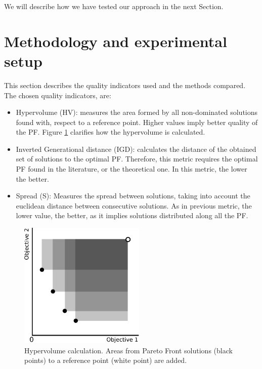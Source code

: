 \documentclass[Afour,sageh,times]{sagej}
\begin{document}
We will describe how we have tested our approach in the next Section.




%
%
\section{Methodology and experimental setup}
\label{sec:met}

This section describes the quality indicators used and the methods compared. The chosen quality indicators, are:

\begin{itemize}
\item Hypervolume (HV): measures the area formed by all non-dominated solutions found with, respect to a reference point. Higher values imply better quality of the PF. Figure \ref{fig:hypervolume} clarifies how the hypervolume is calculated.
\item Inverted Generational distance (IGD): calculates the distance of the obtained set of solutions to the optimal PF. Therefore, this metric requires the optimal PF found in the literature, or the theoretical one. In this metric, the lower the better. %
\item Spread (S): Measures the spread between solutions, taking into account the euclidean distance between consecutive solutions. As in previous metric, the lower value, the better, as it implies solutions distributed along all the PF.
\end{itemize}

\begin{figure}
\centering
\includegraphics[width=6cm]{hypervolume.pdf}
\caption{Hypervolume calculation. Areas from Pareto Front solutions (black points) to a reference point (white point) are added.}
\label{fig:hypervolume}
\end{figure}
\end{document}
